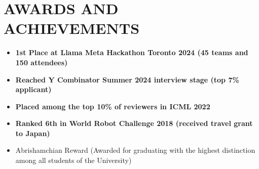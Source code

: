 \documentclass[11pt,a4paper,roman,colorlinks,linkcolor=blue,filecolor=magenta,urlcolor=cyan]{moderncv}        %
\begin{document}
\section{AWARDS AND ACHIEVEMENTS}
\begin{minipage}{\maincolumnwidth}%
	\small{
    	\begin{itemize}
                \item \textbf{1st Place at Llama Meta Hackathon Toronto 2024 (45 teams and 150 attendees) \href{}{}}
            \item \textbf{Reached Y Combinator Summer 2024 interview stage (top 7\% applicant)}
                \item \textbf{Placed among the \textbf{top 10\% of reviewers} in ICML 2022}
    			\item \textbf{Ranked 6th in World Robot Challenge 2018 (received travel grant to Japan)}%
    	    \item {Abrishamchian Reward (Awarded for graduating with the highest distinction among all students of the University)}


\end{itemize}}
\end{minipage}
\end{document}

